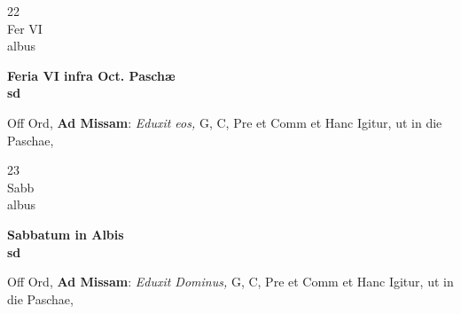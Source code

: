 \documentclass[10pt, openany]{book}
\begin{document}
        \begin{center}
            \begin{minipage}{3.5in}
                \vspace{2em}
                \begin{minipage}{0.5in}
                    {\Huge 22} \\
                    {\normalsize Fer VI} \\
                    {\normalsize albus}
                \end{minipage}
                \begin{minipage}{3.0in}
                    \textbf{ \large Feria VI infra Oct. Paschæ \\
                    \textnormal{\normalsize sd}} \\ 
                \end{minipage}
                \begin{justify}Off Ord, \textbf{Ad Missam}: \textit{Eduxit eos,} G, C, Pre et Comm et Hanc Igitur, ut in die Paschae,  
                \end{justify}
            \end{minipage}
        \end{center}
    
        \begin{center}
            \begin{minipage}{3.5in}
                \vspace{2em}
                \begin{minipage}{0.5in}
                    {\Huge 23} \\
                    {\normalsize Sabb} \\
                    {\normalsize albus}
                \end{minipage}
                \begin{minipage}{3.0in}
                    \textbf{ \large Sabbatum in Albis \\
                    \textnormal{\normalsize sd}} \\ 
                \end{minipage}
                \begin{justify}Off Ord, \textbf{Ad Missam}: \textit{Eduxit Dominus,} G, C, Pre et Comm et Hanc Igitur, ut in die Paschae,  
                \end{justify}
            \end{minipage}
        \end{center}
    
\end{document}

